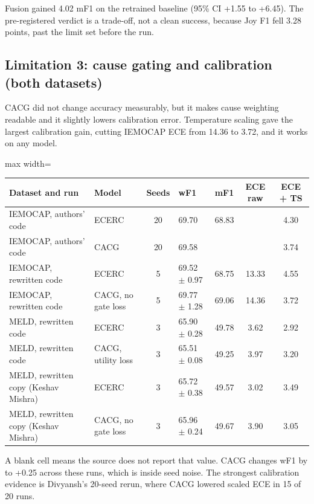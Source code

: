\documentclass[11pt,a4paper]{article}
\newcommand{\mn}{\textminus}
\begin{document}
Fusion gained 4.02 mF1 on the retrained baseline (95\% CI +1.55 to +6.45). The pre-registered verdict is a trade-off, not a clean success, because Joy F1 fell 3.28 points, past the \mn2.0 limit set before the run.

\subsection{Limitation 3: cause gating and calibration (both datasets)}

CACG did not change accuracy measurably, but it makes cause weighting readable and it slightly lowers calibration error. Temperature scaling gave the largest calibration gain, cutting IEMOCAP ECE from 14.36 to 3.72, and it works on any model.

\begin{center}
\begin{adjustbox}{max width=\linewidth}
\begin{tabular}{llcllcc}
\toprule
Dataset and run & Model & Seeds & wF1 & mF1 & ECE raw & ECE + TS \\
\midrule
IEMOCAP, authors' code & ECERC & 20 & 69.70 & 68.83 & & 4.30 \\
IEMOCAP, authors' code & CACG & 20 & 69.58 & & & 3.74 \\
IEMOCAP, rewritten code & ECERC & 5 & 69.52 $\pm$ 0.97 & 68.75 & 13.33 & 4.55 \\
IEMOCAP, rewritten code & CACG, no gate loss & 5 & 69.77 $\pm$ 1.28 & 69.06 & 14.36 & 3.72 \\
MELD, rewritten code & ECERC & 3 & 65.90 $\pm$ 0.28 & 49.78 & 3.62 & 2.92 \\
MELD, rewritten code & CACG, utility loss & 3 & 65.51 $\pm$ 0.08 & 49.25 & 3.97 & 3.20 \\
MELD, rewritten copy (Keshav Mishra) & ECERC & 3 & 65.72 $\pm$ 0.38 & 49.57 & 3.02 & 3.49 \\
MELD, rewritten copy (Keshav Mishra) & CACG, no gate loss & 3 & 65.96 $\pm$ 0.24 & 49.67 & 3.90 & 3.05 \\
\bottomrule
\end{tabular}
\end{adjustbox}
\end{center}

A blank cell means the source does not report that value. CACG changes wF1 by \mn0.39 to +0.25 across these runs, which is inside seed noise. The strongest calibration evidence is Divyansh's 20-seed rerun, where CACG lowered scaled ECE in 15 of 20 runs.
\end{document}
